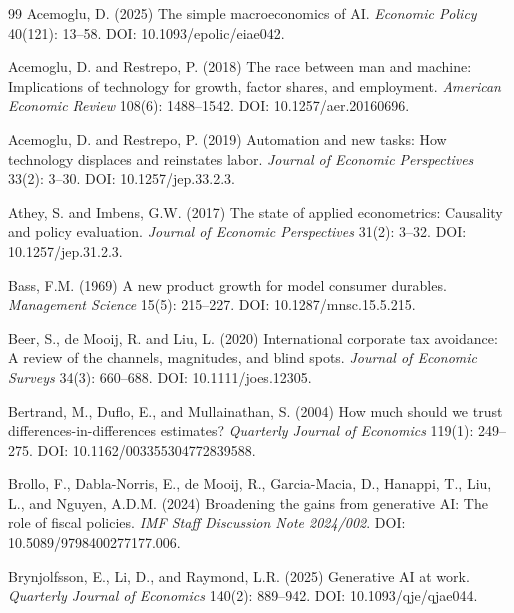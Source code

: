 \documentclass[11pt,a4paper]{article}
\begin{document}
\begin{thebibliography}{99}
Acemoglu, D. (2025)
\newblock The simple macroeconomics of AI.
\newblock \emph{Economic Policy} 40(121): 13--58. DOI: 10.1093/epolic/eiae042.

Acemoglu, D. and Restrepo, P. (2018)
\newblock The race between man and machine: Implications of technology for growth, factor shares, and employment.
\newblock \emph{American Economic Review} 108(6): 1488--1542. DOI: 10.1257/aer.20160696.

Acemoglu, D. and Restrepo, P. (2019)
\newblock Automation and new tasks: How technology displaces and reinstates labor.
\newblock \emph{Journal of Economic Perspectives} 33(2): 3--30. DOI: 10.1257/jep.33.2.3.


Athey, S. and Imbens, G.W. (2017)
\newblock The state of applied econometrics: Causality and policy evaluation.
\newblock \emph{Journal of Economic Perspectives} 31(2): 3--32. DOI: 10.1257/jep.31.2.3.

Bass, F.M. (1969)
\newblock A new product growth for model consumer durables.
\newblock \emph{Management Science} 15(5): 215--227. DOI: 10.1287/mnsc.15.5.215.

Beer, S., de Mooij, R. and Liu, L. (2020)
\newblock International corporate tax avoidance: A review of the channels, magnitudes, and blind spots.
\newblock \emph{Journal of Economic Surveys} 34(3): 660--688. DOI: 10.1111/joes.12305.

Bertrand, M., Duflo, E., and Mullainathan, S. (2004)
\newblock How much should we trust differences-in-differences estimates?
\newblock \emph{Quarterly Journal of Economics} 119(1): 249--275. DOI: 10.1162/003355304772839588.

Brollo, F., Dabla-Norris, E., de Mooij, R., Garcia-Macia, D., Hanappi, T., Liu, L., and Nguyen, A.D.M. (2024)
\newblock Broadening the gains from generative AI: The role of fiscal policies.
\newblock \emph{IMF Staff Discussion Note 2024/002}. DOI: 10.5089/9798400277177.006.

Brynjolfsson, E., Li, D., and Raymond, L.R. (2025)
\newblock Generative AI at work.
\newblock \emph{Quarterly Journal of Economics} 140(2): 889--942. DOI: 10.1093/qje/qjae044.


\end{thebibliography}
\end{document}
